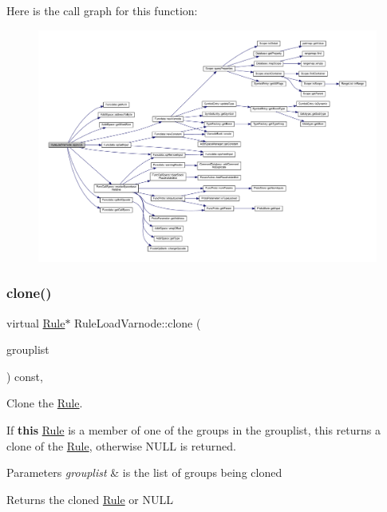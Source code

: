 Here is the call graph for this function\+:
\nopagebreak
\begin{figure}[H]
\begin{center}
\leavevmode
\includegraphics[width=350pt]{class_rule_load_varnode_aba1b981179387a727272c5ba7b407777_cgraph}
\end{center}
\end{figure}
\mbox{\label{class_rule_load_varnode_a7f29e5dd4a43fa70e6cc1bf882b4e807}} 
\subsubsection{\texorpdfstring{clone()}{clone()}}
{\footnotesize\ttfamily virtual \mbox{\hyperlink{class_rule}{Rule}}$\ast$ Rule\+Load\+Varnode\+::clone (\begin{DoxyParamCaption}\item[{const \mbox{\hyperlink{class_action_group_list}{Action\+Group\+List}} \&}]{grouplist }\end{DoxyParamCaption}) const\hspace{0.3cm}{\ttfamily [inline]}, {\ttfamily [virtual]}}



Clone the \mbox{\hyperlink{class_rule}{Rule}}. 

If {\bfseries{this}} \mbox{\hyperlink{class_rule}{Rule}} is a member of one of the groups in the grouplist, this returns a clone of the \mbox{\hyperlink{class_rule}{Rule}}, otherwise N\+U\+LL is returned. 
\begin{DoxyParams}{Parameters}
{\em grouplist} & is the list of groups being cloned \\
\hline
\end{DoxyParams}
\begin{DoxyReturn}{Returns}
the cloned \mbox{\hyperlink{class_rule}{Rule}} or N\+U\+LL 
\end{DoxyReturn}


